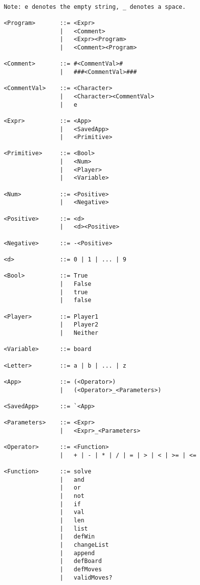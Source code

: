 \documentclass{article}
\begin{document}
\begin{verbatim}

    Note: e denotes the empty string, _ denotes a space.

    <Program>       ::= <Expr>
                    |   <Comment>
                    |   <Expr><Program>
                    |   <Comment><Program>

    <Comment>       ::= #<CommentVal>#
                    |   ###<CommentVal>###

    <CommentVal>    ::= <Character>
                    |   <Character><CommentVal>
                    |   e

    <Expr>          ::= <App>
                    |   <SavedApp>
                    |   <Primitive>

    <Primitive>     ::= <Bool>
                    |   <Num>
                    |   <Player>
                    |   <Variable>

    <Num>           ::= <Positive>
                    |   <Negative>

    <Positive>      ::= <d>
                    |   <d><Positive>

    <Negative>      ::= -<Positive>
    
    <d>             ::= 0 | 1 | ... | 9
    
    <Bool>          ::= True
                    |   False
                    |   true
                    |   false
    
    <Player>        ::= Player1
                    |   Player2
                    |   Neither
                    
    <Variable>      ::= board
                    
    <Letter>        ::= a | b | ... | z

    <App>           ::= (<Operator>)
                    |   (<Operator>_<Parameters>)
                    
    <SavedApp>      ::= `<App>
    
    <Parameters>    ::= <Expr>
                    |   <Expr>_<Parameters>
                    
    <Operator>      ::= <Function>
                    |   + | - | * | / | = | > | < | >= | <=
                    
    <Function>      ::= solve
                    |   and
                    |   or
                    |   not
                    |   if
                    |   val
                    |   len
                    |   list
                    |   defWin
                    |   changeList
                    |   append
                    |   defBoard
                    |   defMoves
                    |   validMoves?
            
\end{verbatim}
\end{document}
